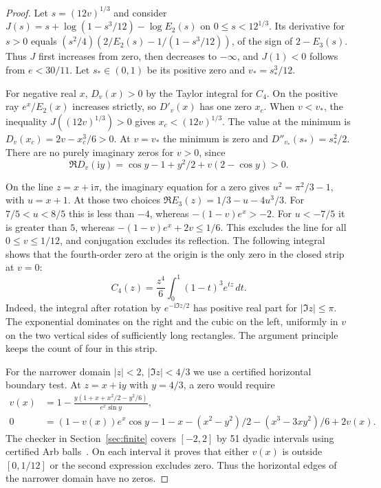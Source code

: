 \documentclass[11pt]{article}
\newcommand{\ii}{\mathrm{i}}
\begin{document}
\begin{proof}
Let \(s=(12v)^{1/3}\) and consider \(J(s)=s+\log(1-s^3/12)-\log E_2(s)\) on \(0\le s<12^{1/3}\). Its derivative for \(s>0\) equals \((s^2/4)(2/E_2(s)-1/(1-s^3/12))\), of the sign of \(2-E_3(s)\). Thus \(J\) first increases from zero, then decreases to \(-\infty\), and \(J(1)<0\) follows from \(e<30/11\). Let \(s_*\in(0,1)\) be its positive zero and \(v_*=s_*^3/12\).

For negative real \(x\), \(D_v(x)>0\) by the Taylor integral for \(C_4\). On the positive ray \(e^x/E_2(x)\) increases strictly, so \(D'_v(x)\) has one zero \(x_c\). When \(v<v_*\), the inequality \(J((12v)^{1/3})>0\) gives \(x_c<(12v)^{1/3}\). The value at the minimum is \(D_v(x_c)=2v-x_c^3/6>0\). At \(v=v_*\) the minimum is zero and \(D''_{v_*}(s_*)=s_*^2/2\). There are no purely imaginary zeros for \(v>0\), since
\[
\Re D_v(\ii y)=\cos y-1+y^2/2+v(2-\cos y)>0.
\]

On the line \(z=x+\ii\pi\), the imaginary equation for a zero gives \(u^2=\pi^2/3-1\), with \(u=x+1\). At those two choices \(\Re E_3(z)=1/3-u-4u^3/3\). For \(7/5<u<8/5\) this is less than \(-4\), whereas \(-(1-v)e^x>-2\). For \(u<-7/5\) it is greater than \(5\), whereas \(-(1-v)e^x+2v\le1/6\). This excludes the line for all \(0\le v\le1/12\), and conjugation excludes its reflection. The following integral shows that the fourth-order zero at the origin is the only zero in the closed strip at \(v=0\):
\[
C_4(z)=\frac{z^4}{6}\int_0^1(1-t)^3e^{tz}\,dt.
\]
Indeed, the integral after rotation by \(e^{-\ii\Im z/2}\) has positive real part for \(|\Im z|\le\pi\). The exponential dominates on the right and the cubic on the left, uniformly in \(v\) on the two vertical sides of sufficiently long rectangles. The argument principle keeps the count of four in this strip.

For the narrower domain \(|z|<2,\ |\Im z|<4/3\) we use a certified horizontal boundary test. At \(z=x+\ii y\) with \(y=4/3\), a zero would require
\begin{align*}
v(x)&=1-\frac{y(1+x+x^2/2-y^2/6)}{e^x\sin y},\\
0&=(1-v(x))e^x\cos y-1-x-(x^2-y^2)/2-(x^3-3xy^2)/6+2v(x).
\end{align*}
The checker in Section~\ref{sec:finite} covers \([-2,2]\) by 51 dyadic intervals using certified Arb balls~\cite{arb}. On each interval it proves that either \(v(x)\) is outside \([0,1/12]\) or the second expression excludes zero. Thus the horizontal edges of the narrower domain have no zeros.


\end{proof}
\end{document}
